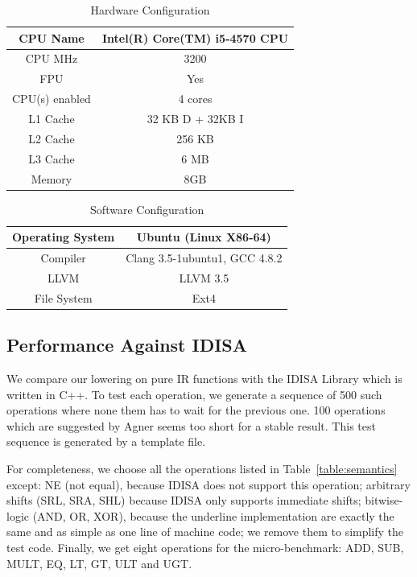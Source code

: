 \begin{table}[h]
\centering
\begin{tabular}{|c|c|}
\hline
CPU Name       & Intel(R) Core(TM) i5-4570 CPU \\ \hline
CPU MHz        & 3200                          \\ \hline
FPU            & Yes                           \\ \hline
CPU(s) enabled & 4 cores                       \\ \hline
L1 Cache       & 32 KB D + 32KB I              \\ \hline
L2 Cache       & 256 KB                        \\ \hline
L3 Cache       & 6 MB                          \\ \hline
Memory         & 8GB                           \\ \hline
\end{tabular}
\caption{Hardware Configuration}
\label{table:hardware_config}
\end{table}

\begin{table}[h]
\centering
\begin{tabular}{|c|c|}
\hline
Operating System & Ubuntu (Linux X86-64)         \\ \hline
Compiler         & Clang 3.5-1ubuntu1, GCC 4.8.2 \\ \hline
LLVM             & LLVM 3.5                      \\ \hline
File System      & Ext4                          \\ \hline
\end{tabular}
\caption{Software Configuration}
\label{table:software_config}
\end{table}

\subsection{Performance Against IDISA}
We compare our lowering on pure IR functions with the IDISA Library \cite{hua_idisa} which is written in C++. To test each operation, we generate a sequence of 500 such operations where none them has to wait for the previous one. 100 operations which are suggested by Agner seems too short for a stable result. This test sequence is generated by a template file.

For completeness, we choose all the operations listed in Table~\ref{table:semantics} except: NE (not equal), because IDISA does not support this operation; arbitrary shifts (SRL, SRA, SHL) because IDISA only supports immediate shifts; bitwise-logic (AND, OR, XOR), because the underline implementation are exactly the same and as simple as one line of machine code; we remove them to simplify the test code. Finally, we get eight operations for the micro-benchmark: ADD, SUB, MULT, EQ, LT, GT, ULT and UGT.

